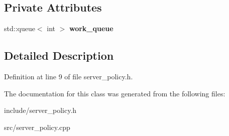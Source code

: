 \subsection*{Private Attributes}
\begin{DoxyCompactItemize}
\item 
std\+::queue$<$ int $>$ {\bfseries work\+\_\+queue}\hypertarget{classdistributed__system_1_1ServerMutualExclusionPolicy_a3b83f6d4011132a21b274e445d36b740}{}\label{classdistributed__system_1_1ServerMutualExclusionPolicy_a3b83f6d4011132a21b274e445d36b740}

\end{DoxyCompactItemize}


\subsection{Detailed Description}


Definition at line 9 of file server\+\_\+policy.\+h.



The documentation for this class was generated from the following files\+:\begin{DoxyCompactItemize}
\item 
include/server\+\_\+policy.\+h\item 
src/server\+\_\+policy.\+cpp\end{DoxyCompactItemize}
